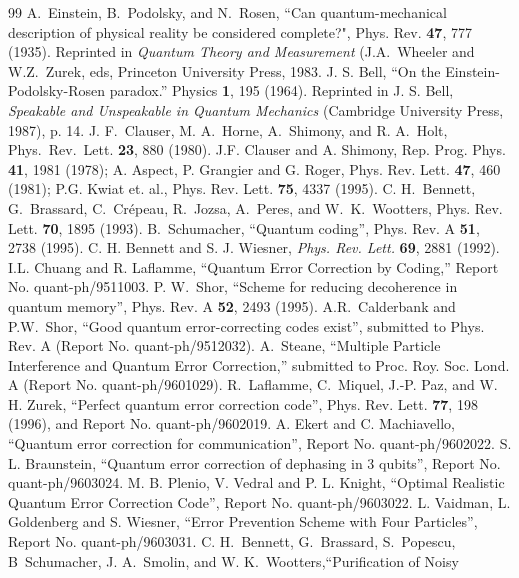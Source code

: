  
\begin{thebibliography}{99}
 A.~Einstein, B.~Podolsky, and N.~Rosen, ``Can
quantum-mechanical description of physical reality be considered
complete?", Phys. Rev. {\bf 47}, 777 (1935).  Reprinted in
{\it Quantum Theory and Measurement} (J.A.~Wheeler and W.Z.~Zurek, eds,
Princeton University Press, 1983.
 J. S. Bell, ``On the Einstein-Podolsky-Rosen paradox.''
Physics {\bf 1}, 195 (1964).  Reprinted in J. S. Bell, {\em Speakable
and Unspeakable in Quantum Mechanics} (Cambridge University Press,
1987), p. 14.
 J. F.~Clauser, M. A.~Horne, A.~Shimony, and R. A.~Holt,
Phys.~Rev.~Lett. {\bf 23}, 880 (1980).
 J.F. Clauser and A. Shimony, Rep. Prog. Phys. {\bf 41},
1981 (1978);  A. Aspect, P. Grangier and G. Roger, Phys. Rev. Lett. {\bf 47},
460 (1981); P.G. Kwiat et. al., Phys. Rev. Lett. {\bf 75}, 4337 (1995).
 C. H.~Bennett, G.~Brassard, C.~Cr\'epeau, R.~Jozsa,
A.~Peres, and W.~K.~Wootters, Phys. Rev. Lett. {\bf 70}, 1895 (1993).
B.~Schumacher, ``Quantum coding'', Phys. Rev. A {\bf 51},
2738 (1995).
 C. H. Bennett and S. J. Wiesner, {\em Phys. Rev. Lett.\/}
{\bf69}, 2881 (1992).
 I.L. Chuang and R. Laflamme, ``Quantum Error
Correction by Coding,'' Report No. quant-ph/9511003.
 P. W.~Shor, ``Scheme for reducing decoherence in
quantum memory'', Phys. Rev. A {\bf 52}, 2493 (1995).
 A.R.~Calderbank and P.W.~Shor,
``Good quantum error-correcting codes exist'', submitted to Phys. Rev. A
(Report No. quant-ph/9512032).
 A.~Steane, ``Multiple Particle Interference and
Quantum Error Correction,'' submitted to Proc. Roy. Soc. Lond. A
(Report No. quant-ph/9601029).
 R.~Laflamme, C.~Miquel, J.-P. Paz, and W. H. Zurek,
``Perfect quantum error correction code'', Phys. Rev. Lett. {\bf 77},
198 (1996), and Report No. quant-ph/9602019.
 A. Ekert and C. Machiavello, ``Quantum error correction
for communication'', Report No. quant-ph/9602022.
 S. L. Braunstein, ``Quantum error correction of dephasing
in 3 qubits'', Report No. quant-ph/9603024.
 M. B. Plenio, V. Vedral and P. L. Knight,
``Optimal Realistic Quantum Error Correction Code'', Report No. quant-ph/9603022.
 L. Vaidman, L. Goldenberg and S. Wiesner,
``Error Prevention Scheme with Four Particles'', Report No. quant-ph/9603031.
 C. H.~Bennett, G.~Brassard, S.~Popescu,
B~Schumacher, J. A.~Smolin, and W. K.~Wootters,``Purification of Noisy

\end{thebibliography}
